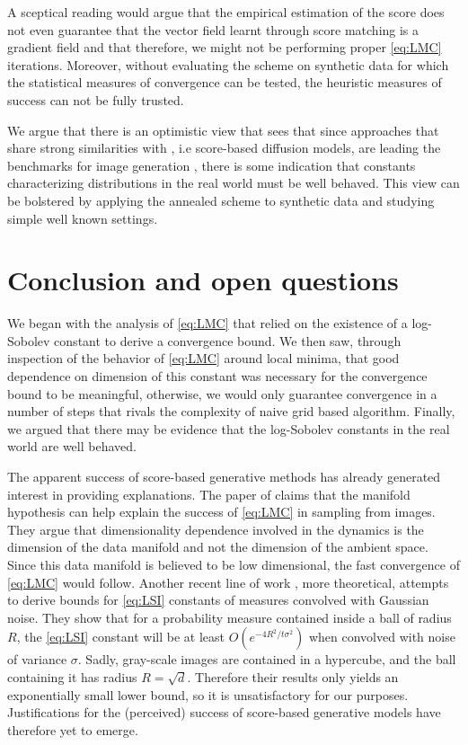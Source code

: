 \documentclass[10pt,journal,a4paper]{IEEEtran}
\theoremstyle{definition}
\begin{document}
A sceptical reading would argue that the empirical estimation of the score does not even guarantee that the vector field learnt through score matching is a gradient field and that therefore, we might not be performing proper \eqref{eq:LMC} iterations. Moreover, without evaluating the scheme on synthetic data for which the statistical measures of convergence can be tested, the heuristic measures of success can not be fully trusted.

We argue that there is an optimistic view that sees that since approaches that share strong similarities with \cite{song_generative_2019}, i.e score-based diffusion models, are leading the benchmarks for image generation \cite{noauthor_papers_nodate}, there is some indication that constants characterizing distributions in the real world must be well behaved. This view can be bolstered by applying the annealed scheme to synthetic data and studying simple well known settings.


\section{Conclusion and open questions}

We began with the analysis of \eqref{eq:LMC} that relied on the existence of a log-Sobolev constant to derive a convergence bound. We then saw, through inspection of the behavior of \eqref{eq:LMC} around local minima, that good dependence on dimension of this constant was necessary for the convergence bound to be meaningful, otherwise, we would only guarantee convergence in a number of steps that rivals the complexity of naive grid based algorithm.  Finally, we argued that there may be evidence that the log-Sobolev constants in the real world are well behaved.

The apparent success of score-based generative methods has already generated interest in providing explanations. The paper of \cite{block_fast_2020} claims that the manifold hypothesis can help explain the success of \eqref{eq:LMC} in sampling from images. They argue that dimensionality dependence involved in the dynamics is the dimension of the data manifold and not the dimension of the ambient space. Since this data manifold is believed to be low dimensional, the fast convergence of \eqref{eq:LMC} would follow. Another recent line of work \cite{chen_dimension-free_2021}, more theoretical, attempts to derive bounds for \eqref{eq:LSI} constants of measures convolved with Gaussian noise. They show that for a probability measure contained inside a ball of radius $R$, the \eqref{eq:LSI} constant will be at least $O(e^{-4R^2/t\sigma^2})$ when convolved with noise of variance $\sigma$. Sadly, gray-scale images are contained in a hypercube, and the ball containing it has radius $R = \sqrt{d}$. Therefore their results only yields an exponentially small lower bound, so it is unsatisfactory for our purposes. Justifications for the (perceived) success of score-based generative models have therefore yet to emerge.
\end{document}
